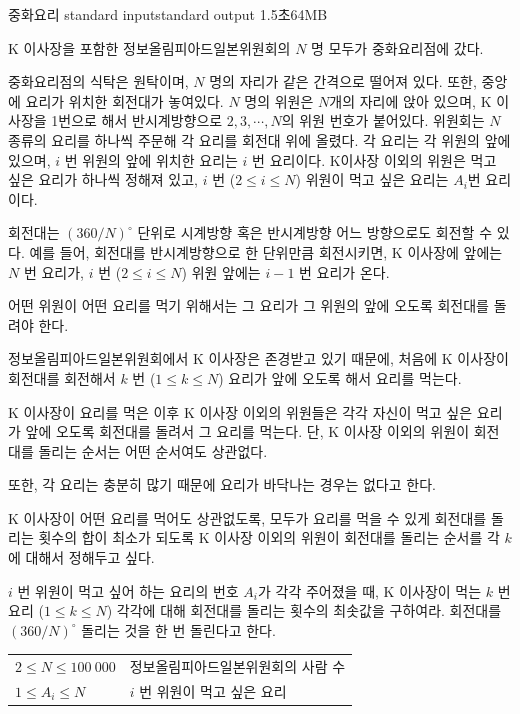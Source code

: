 
\begin{problem}{중화요리}
	{standard input}{standard output}
	{1.5초}{64MB}{}
	
	K 이사장을 포함한 정보올림피아드일본위원회의 $N$ 명 모두가 중화요리점에 갔다.
	
	중화요리점의 식탁은 원탁이며, $N$ 명의 자리가 같은 간격으로 떨어져 있다. 또한, 중앙에 요리가 위치한 회전대가 놓여있다. $N$ 명의 위원은 $N$개의 자리에 앉아 있으며, K 이사장을 1번으로 해서 반시계방향으로 $2, 3, \cdots, N$의 위원 번호가 붙어있다. 위원회는 $N$ 종류의 요리를 하나씩 주문해 각 요리를 회전대 위에 올렸다. 각 요리는 각 위원의 앞에 있으며, $i$ 번 위원의 앞에 위치한 요리는 $i$ 번 요리이다. K이사장 이외의 위원은 먹고 싶은 요리가 하나씩 정해져 있고, $i$ 번 ($2 \le i \le N$) 위원이 먹고 싶은 요리는 $A_i$번 요리이다.
	
	회전대는 $(360/N)^{\circ}$ 단위로 시계방향 혹은 반시계방향 어느 방향으로도 회전할 수 있다. 예를 들어, 회전대를 반시계방향으로 한 단위만큼 회전시키면, K 이사장에 앞에는 $N$ 번 요리가, $i$ 번 ($2 \le i \le N$) 위원 앞에는 $i-1$ 번 요리가 온다.
	
	어떤 위원이 어떤 요리를 먹기 위해서는 그 요리가 그 위원의 앞에 오도록 회전대를 돌려야 한다.
	
	정보올림피아드일본위원회에서 K 이사장은 존경받고 있기 때문에, 처음에 K 이사장이 회전대를 회전해서 $k$ 번 ($1 \le k \le N$) 요리가 앞에 오도록 해서 요리를 먹는다.
	
	K 이사장이 요리를 먹은 이후 K 이사장 이외의 위원들은 각각 자신이 먹고 싶은 요리가 앞에 오도록 회전대를 돌려서 그 요리를 먹는다. 단, K 이사장 이외의 위원이 회전대를 돌리는 순서는 어떤 순서여도 상관없다.
	
	또한, 각 요리는 충분히 많기 때문에 요리가 바닥나는 경우는 없다고 한다.
	
	K 이사장이 어떤 요리를 먹어도 상관없도록, 모두가 요리를 먹을 수 있게 회전대를 돌리는 횟수의 합이 최소가 되도록 K 이사장 이외의 위원이 회전대를 돌리는 순서를 각 $k$에 대해서 정해두고 싶다.
	
	$i$ 번 위원이 먹고 싶어 하는 요리의 번호 $A_i$가 각각 주어졌을 때, K 이사장이 먹는 $k$ 번 요리 ($1 \le k \le N$) 각각에 대해 회전대를 돌리는 횟수의 최솟값을 구하여라. 회전대를 $(360/N)^{\circ}$ 돌리는 것을 한 번 돌린다고 한다.


\Constraints


\begin{tabular}{ll}
	$2 \le N \le 100\ 000$ & 정보올림피아드일본위원회의 사람 수 \\
	$1 \le A_i \le N$ & $i$ 번 위원이 먹고 싶은 요리 \\
\end{tabular}



\end{problem}
